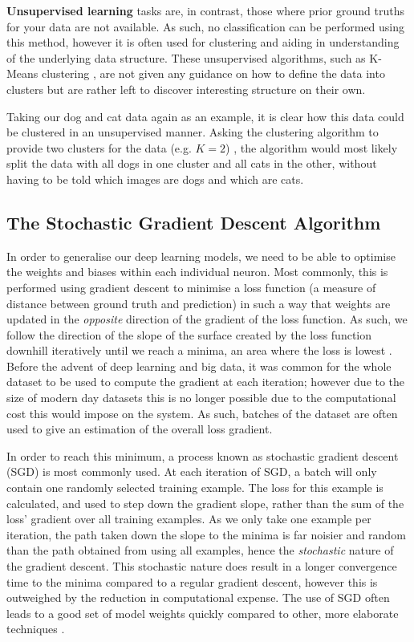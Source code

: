 \textbf{Unsupervised learning} tasks are, in contrast, those where prior ground truths for your data are not available. As such, no classification can be performed using this method, however it is often used for clustering and aiding in understanding of the underlying data structure. These unsupervised algorithms, such as K-Means clustering \cite{hartigan_algorithm_1979}, are not given any guidance on how to define the data into clusters but are rather left to discover interesting structure on their own. 

Taking our dog and cat data again as an example, it is clear how this data could be clustered in an unsupervised manner. Asking the clustering algorithm to provide two clusters for the data  (e.g. $K = 2$) , the algorithm would most likely split the data with all dogs in one cluster and all cats in the other, without having to be told which images are dogs and which are cats. 

\subsection{The Stochastic Gradient Descent Algorithm}\label{ch:Background,sec:DLIntro,sub:stochasticgradientdescent}
In order to generalise our deep learning models, we need to be able to optimise the weights and biases within each individual neuron. Most commonly, this is performed using gradient descent to minimise a loss function (a measure of distance between ground truth and prediction)  in such a way that weights are updated in the \textit{opposite} direction of the gradient of the loss function. As such, we follow the direction of the slope of the surface created by the loss function downhill iteratively until we reach a minima, an area where the loss is lowest \cite{ruder_overview_2016.}. Before the advent of deep learning and big data, it was common for the whole dataset to be used to compute the gradient at each iteration; however due to the size of modern day datasets this is no longer possible due to the computational cost this would impose on the system. As such, batches of the dataset are often used to give an estimation of the overall loss gradient.

In order to reach this minimum, a process known as stochastic gradient descent (SGD) is most commonly used. At each iteration of SGD, a batch will only contain one randomly selected training example. The loss for this example is calculated, and used to step down the gradient slope, rather than the sum of the loss' gradient over all training examples. As we only take one example per iteration, the path taken down the slope to the minima is far noisier and random than the path obtained from using all examples, hence the \textit{stochastic} nature of the gradient descent. This stochastic nature does result in a longer convergence time to the minima compared to a regular gradient descent, however this is outweighed by the reduction in computational expense. The use of SGD often leads to a good set of model weights quickly compared to other, more elaborate techniques \cite{bottou_tradeoffs_2008}. 

